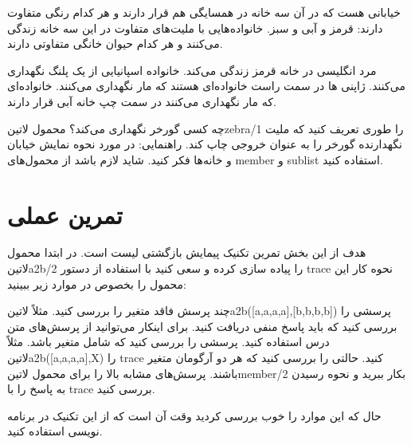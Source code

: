 \begin{exercise}
خیابانی هست که در آن سه خانه در همسایگی هم قرار دارند و هر کدام رنگی متفاوت دارند: قرمز و آبی و سبز. خانواده‌هایی با ملیت‌های متفاوت در این سه خانه زندگی می‌کنند و هر کدام حیوان خانگی متفاوتی دارند.
\begin{enumerate}
 مرد انگلیسی در خانه قرمز زندگی می‌کند.
 خانواده اسپانیایی از یک پلنگ نگهداری می‌کنند.
 ژاپنی ها در سمت راست خانواده‌ای هستند که مار نگهداری می‌کنند.
 خانواده‌ای که مار نگهداری می‌کنند در سمت چپ خانه آبی قرار دارند.
\end{enumerate}
چه کسی گورخر نگهداری می‌کند؟ محمول ‌لاتین{zebra/1} را طوری تعریف کنید که ملیت نگهدارنده گورخر را به عنوان خروجی چاپ کند. راهنمایی: در مورد نحوه نمایش خیابان و خانه‌ها فکر کنید. شاید لازم باشد از محمول‌های member و sublist استفاده کنید.
\end{exercise}
\section{تمرین عملی}

هدف از این بخش تمرین تکنیک پیمایش بازگشتی لیست است. در ابتدا محمول ‌لاتین{a2b/2} را پیاده سازی کرده و سعی کنید با استفاده از دستور trace نحوه کار این محمول را بخصوص در موارد زیر ببینید:

\begin{enumerate}
 چند پرسش فاقد متغیر را بررسی کنید. مثلاً ‌لاتین{a2b([a,a,a,a],[b,b,b,b])} 
 پرسشی را بررسی کنید که باید پاسخ منفی دریافت کنید. برای اینکار می‌توانید از پرسش‌های متن درس استفاده کنید.
 پرسشی را بررسی کنید که شامل متغیر باشد. مثلاً ‌لاتین{a2b([a,a,a,a],X)} را trace کنید.
 حالتی را بررسی کنید که هر دو آرگومان متغیر باشند.
 پرسش‌های مشابه بالا را برای محمول ‌لاتین{member/2} بکار ببرید و نحوه رسیدن به پاسخ را با trace بررسی کنید.
\end{enumerate}

حال که این موارد را خوب بررسی کردید وقت آن است که از این تکنیک در برنامه نویسی استفاده کنید.

